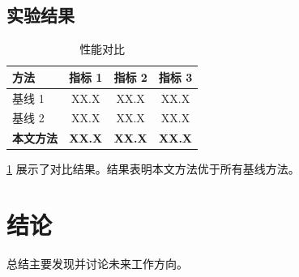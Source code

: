 \documentclass[macnew, cn]{manuscript}
\begin{document}
\subsection{实验结果}
\label{subsec:results}

\begin{table}[t]
    \centering
    \caption{性能对比}
    \label{tab:results}
    \begin{tabular}{lccc}
        \toprule
        方法 & 指标 1 & 指标 2 & 指标 3 \\
        \midrule
        基线 1 & XX.X & XX.X & XX.X \\
        基线 2 & XX.X & XX.X & XX.X \\
        \textbf{本文方法} & \textbf{XX.X} & \textbf{XX.X} & \textbf{XX.X} \\
        \bottomrule
    \end{tabular}
\end{table}

\cref{tab:results} 展示了对比结果。结果表明本文方法优于所有基线方法。

\section{结论}
\label{sec:conclusion}

总结主要发现并讨论未来工作方向。

\appendix
\end{document}
